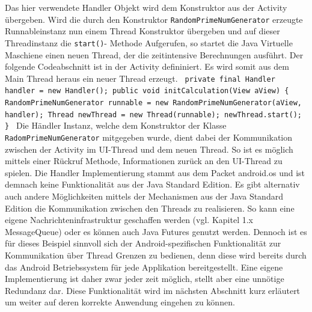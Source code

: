 \documentclass[12pt,oneside,a4paper,bibtotoc,liststotoc]{scrreprt}
\begin{document}
Das hier verwendete Handler Objekt wird dem Konstruktor aus der Activity übergeben. Wird die durch den Konstruktor \texttt{RandomPrimeNumGenerator} erzeugte Runnableinstanz nun einem Thread Konstruktor übergeben und auf dieser Threadinstanz die \texttt{start()}- Methode Aufgerufen, so startet die Java Virtuelle Maschiene einen neuen Thread, der die zeitintensive Berechnungen ausführt. Der folgende Codeabschnitt ist in der Activity defininiert. Es wird somit aus dem Main Thread heraus ein neuer Thread erzeugt.\newline\newline\newline
\texttt{
private final Handler handler = new Handler();\newline\newline
public void initCalculation(View aView)\newline
  \{ \newline
     RandomPrimeNumGenerator runnable =
        new RandomPrimeNumGenerator(aView, handler);\newline\newline  
     Thread newThread = new Thread(runnable);\newline
     newThread.start();\newline
  \} \newline
} \newline
Die Händler Instanz, welche dem Konstruktor der Klasse \texttt{RadomPrimeNumGenerator} mitgegeben wurde, dient dabei der Kommunikation zwischen der Activity im UI-Thread und dem neuen Thread. So ist es möglich mittels einer Rückruf Methode, Informationen zurück an den UI-Thread zu spielen. Die Handler Implementierung stammt aus dem Packet android.os und ist demnach keine Funktionalität aus der Java Standard Edition. Es gibt alternativ auch andere Möglichkeiten mittels der Mechanismen aus der Java Standard Edition die Kommunikation zwischen den Threads zu realisieren. So kann eine eigene Nachrichteninfrastruktur geschaffen werden (vgl. Kapitel 1.x MessageQueue) oder es können auch Java Futures genutzt werden. Dennoch ist es für dieses Beispiel sinnvoll sich der Android-spezifischen Funktionalität zur Kommunikation über Thread Grenzen zu bedienen, denn diese wird bereits durch das Android Betriebssystem für jede Applikation bereitgestellt. Eine eigene Implementierung ist daher zwar jeder zeit möglich, stellt aber eine unnötige Redundanz dar. Diese Funktionalität wird im nächsten Abschnitt kurz erläutert um weiter auf deren korrekte Anwendung eingehen zu können.
\end{document}
